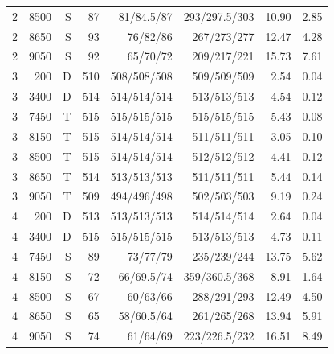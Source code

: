 \begin{longtable}{rrrrrrrr}
2 & 8500 & S & 87 & 81/84.5/87 & 293/297.5/303 & 10.90 & 2.85 \\
2 & 8650 & S & 93 & 76/82/86 & 267/273/277 & 12.47 & 4.28 \\
2 & 9050 & S & 92 & 65/70/72 & 209/217/221 & 15.73 & 7.61 \\
3 & 200 & D & 510 & 508/508/508 & 509/509/509 & 2.54 & 0.04 \\
3 & 3400 & D & 514 & 514/514/514 & 513/513/513 & 4.54 & 0.12 \\
3 & 7450 & T & 515 & 515/515/515 & 515/515/515 & 5.43 & 0.08 \\
3 & 8150 & T & 515 & 514/514/514 & 511/511/511 & 3.05 & 0.10 \\
3 & 8500 & T & 515 & 514/514/514 & 512/512/512 & 4.41 & 0.12 \\
3 & 8650 & T & 514 & 513/513/513 & 511/511/511 & 5.44 & 0.14 \\
3 & 9050 & T & 509 & 494/496/498 & 502/503/503 & 9.19 & 0.24 \\
4 & 200 & D & 513 & 513/513/513 & 514/514/514 & 2.64 & 0.04 \\
4 & 3400 & D & 515 & 515/515/515 & 513/513/513 & 4.73 & 0.11 \\
4 & 7450 & S & 89 & 73/77/79 & 235/239/244 & 13.75 & 5.62 \\
4 & 8150 & S & 72 & 66/69.5/74 & 359/360.5/368 & 8.91 & 1.64 \\
4 & 8500 & S & 67 & 60/63/66 & 288/291/293 & 12.49 & 4.50 \\
4 & 8650 & S & 65 & 58/60.5/64 & 261/265/268 & 13.94 & 5.91 \\
4 & 9050 & S & 74 & 61/64/69 & 223/226.5/232 & 16.51 & 8.49 \\
\end{longtable}
\endgroup
